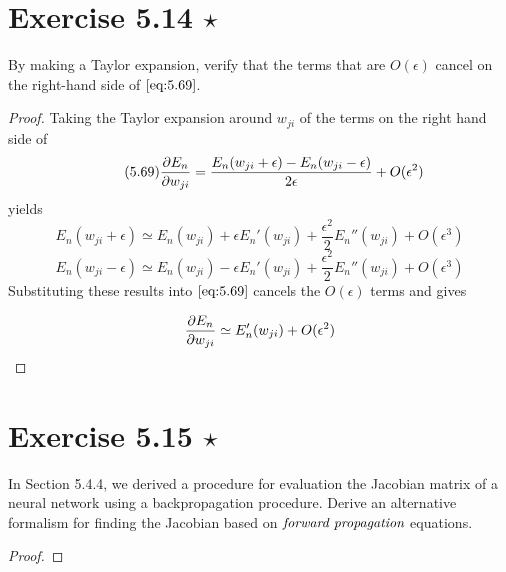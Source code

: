 \section*{Exercise 5.14 $\star$}
By making a Taylor expansion, verify that the terms that are $O(\epsilon)$ 
cancel on the right-hand side of $\eqref{eq:5.69}$.

\vspace{1em}

\begin{proof}
    Taking the Taylor expansion around $w_{ji}$ of the terms on the right hand side of
    \begin{equation}\label{eq:5.69}\tag{5.69}
        \pdv{E_n}{w_{ji}} = \frac{E_n(w_{ji} + \epsilon) - E_n(w_{ji} - \epsilon)}{2\epsilon}
        + O(\epsilon^2)
    \end{equation}
    yields
    \[
        E_n(w_{ji} + \epsilon) \simeq E_n(w_{ji}) + \epsilon E_n'(w_{ji}) 
        + \frac{\epsilon^2}{2} E_n''(w_{ji}) + O(\epsilon^3)
    \] 
    \[
        E_n(w_{ji} - \epsilon) \simeq E_n(w_{ji}) - \epsilon E_n'(w_{ji}) 
        + \frac{\epsilon^2}{2} E_n''(w_{ji}) + O(\epsilon^3)
    \] 
    Substituting these results into $\eqref{eq:5.69}$ cancels
    the $O(\epsilon)$ terms and gives

    \[
        \pdv{E_n}{w_{ji}} \simeq E_n'(w_{ji}) + O(\epsilon^2)
    \] 
\end{proof}

\section*{Exercise 5.15 $\star$}
In Section 5.4.4, we derived a procedure for evaluation the Jacobian
matrix of a neural network using a backpropagation procedure.
Derive an alternative formalism for finding the Jacobian based on 
$\emph{forward propagation}$ equations.

\vspace{1em}

\begin{proof}
    
\end{proof}
